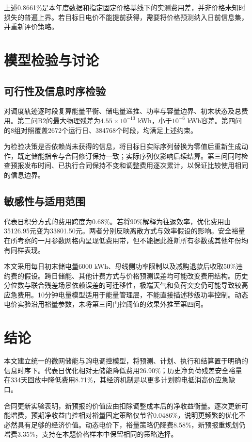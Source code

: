 \documentclass[UTF8,a4paper,zihao=-4,fontset=fandol]{ctexart}
\begin{document}
上述0.8661\%是本年度数据和指定固定价格基线下的实测费用差，并非价格未知时损失的普遍上界。若目标日电价不能提前获得，需要将价格预测纳入日前信息集，并重新评价策略。

\FloatBarrier
\section{模型检验与讨论}
\subsection{可行性及信息时序检验}
对调度轨迹逐时段复算能量平衡、储电量递推、功率与容量边界、初末状态及总费用。第二问B2的最大物理残差为$4.55\times10^{-13}$ kWh，小于$10^{-6}$ kWh容差。第四问的8组对照覆盖2672个运行日、384768个时段，均满足上述约束。

为检验决策是否依赖尚未获得的信息，将目标日实际序列替换为零值后重新生成动作，既定储能指令与合同修订保持一致；实际序列仅影响后续结算。第三问同时检查预报发布时间、已执行合同保持不变和调整费用逐次累计，以保证比较使用相同的信息边界。

\subsection{敏感性与适用范围}
代表日积分方式的费用跨度为0.68\%。若将90\%解释为往返效率，优化费用由35126.95元变为33801.50元。两者分别反映离散方式与效率假设的影响。安全裕量在所考察的一月参数网格内呈现低费用带，但不能据此推断所有参数或其他年份均有同样表现。

本文采用每日初末储电量6000 kWh、母线侧功率限制以及减购退款后收取50\%违约费的假设。跨日储能、其他计费方式与价格预测误差均可能改变费用结构。历史分位数与联合残差场景依赖误差的可迁移性，极端天气和负荷突变仍可能导致较高应急费用。10分钟电量模型适用于能量管理层，不能直接描述秒级功率控制。动态电价实验沿用裕量参数，未将第三问门控阈值的效果外推至第四问。

\FloatBarrier
\section{结论}
本文建立统一的微网储能与购电调控模型，将预测、计划、执行和结算置于明确的信息时序下。代表日优化相对无储能降低费用26.90\%；历史净负荷残差安全裕量在334天回放中降低费用8.71\%，其经济机制是以更多计划购电抵消高价应急缺口。

合同更新实验表明，新预报的价值应由扣除调整成本后的净收益衡量。逐次更新可能增费，预期净收益门控相对裕量固定策略仅节省0.0486\%，说明更频繁的优化不必然具有足够的经济价值。动态电价下，裕量策略仍降费8.58\%，新预报重规划仍增费3.35\%，支持在本题价格样本中保留相同的策略选择。
\end{document}
